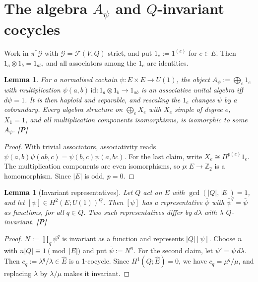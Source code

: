 \documentclass[11pt]{article}
\newtheorem{lemma}[theorem]{Lemma}
\theoremstyle{definition}
\newcommand{\cF}{\mathcal F}
\newcommand{\cG}{\mathcal G}
\newcommand{\Z}{\mathbb Z}
\newcommand{\Ehat}{\widehat E}
\newcommand{\st}[1]{\textbf{[#1]}}
\begin{document}
\section{The algebra $A_\psi$ and $Q$-invariant cocycles}\label{sec:algebra}
Work in $\pi^*\cG$ with $\cG=\cF(V,Q)$ strict, and put $1_e:=1^{(e)}$ for $e\in E$. Then
$1_a\otimes1_b=1_{ab}$, and all associators among the $1_e$ are identities.

\begin{lemma}\label{lem:algebras}
For a normalised cochain $\psi:E\times E\to U(1)$, the object $A_\psi:=\bigoplus_e1_e$ with
multiplication $\psi(a,b)\,\mathrm{id}:1_a\otimes1_b\to1_{ab}$ is an associative unital algebra iff
$d\psi=1$. It is then haploid and separable, and rescaling the $1_e$ changes $\psi$ by a
coboundary. Every algebra structure on $\bigoplus_eX_e$ with $X_e$ simple of degree $e$, $X_1=1$,
and all multiplication components isomorphisms, is isomorphic to some $A_\psi$. \st{P}
\end{lemma}
\begin{proof}
With trivial associators, associativity reads $\psi(a,b)\psi(ab,c)=\psi(b,c)\psi(a,bc)$. For the
last claim, write $X_e\cong\Pi^{p(e)}1_e$. The multiplication components are even isomorphisms,
so $p:E\to\Z_2$ is a homomorphism. Since $|E|$ is odd, $p=0$.
\end{proof}

\begin{lemma}[Invariant representatives]\label{lem:invariant}
Let $Q$ act on $E$ with $\gcd(|Q|,|E|)=1$, and let $[\psi]\in H^2(E;U(1))^Q$. Then $[\psi]$ has a
representative $\bar\psi$ with $\bar\psi^q=\bar\psi$ as functions, for all $q\in Q$. Two such
representatives differ by $d\lambda$ with $\lambda$ $Q$-invariant. \st{P}
\end{lemma}
\begin{proof}
$N:=\prod_q\psi^q$ is invariant as a function and represents $|Q|[\psi]$. Choose $n$ with
$n|Q|\equiv1\pmod{|E|}$ and put $\bar\psi:=N^n$. For the second claim, let $\psi'=\psi\,d\lambda$.
Then $c_q:=\lambda^q/\lambda\in\Ehat$ is a 1-cocycle. Since $H^1(Q;\Ehat)=0$, we have
$c_q=\mu^q/\mu$, and replacing $\lambda$ by $\lambda/\mu$ makes it invariant.
\end{proof}
\end{document}
